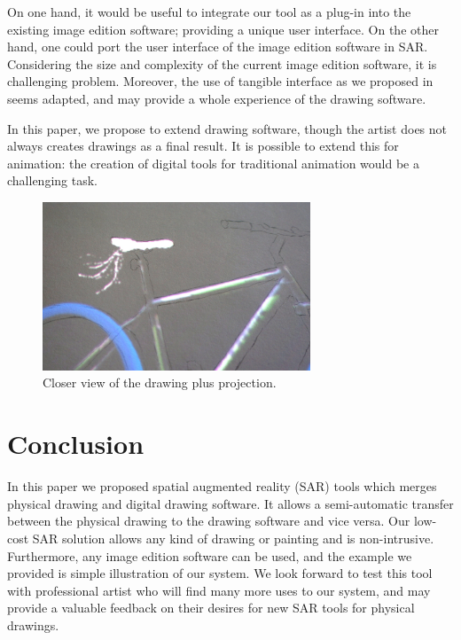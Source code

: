 \documentclass{article}
\begin{document}
On one hand, it would be useful to integrate our tool as a plug-in into the existing image edition software; providing a unique user interface. On the other hand, one could port the user interface of the image edition software in SAR. Considering the size and complexity of the current image edition software, it is challenging problem. Moreover, the use of tangible interface as we proposed in~\cite{laviole:2012} seems adapted, and may provide a whole experience of the drawing software. 

In this paper, we propose to extend drawing software, though the artist does not always creates drawings as a final result. It is possible to extend this for animation: the creation of digital tools for traditional animation would be a challenging task.  


\begin{figure}[!tb]
\centering
\includegraphics[width = 80mm]{velo4.JPG}
\caption{Closer view of the drawing plus projection. \vspace{-0.3cm}} 
\label{fig:zoom}
\end{figure}

\section{Conclusion}

In this paper we proposed spatial augmented reality (SAR) tools which merges physical drawing and digital drawing software. It allows a semi-automatic transfer between the physical drawing to the drawing software and vice versa. Our low-cost SAR solution allows any kind of drawing or painting and is non-intrusive. Furthermore, any image edition software can be used, and the example we provided is simple illustration of our system. We look forward to test this tool with professional artist who will find many more uses to our system, and may provide a valuable feedback on their desires for new SAR tools for physical drawings.




\end{document}
